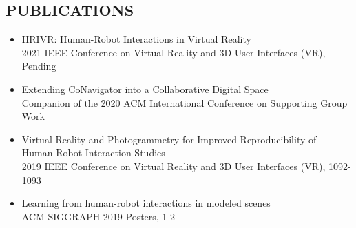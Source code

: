 \documentclass[line]{resume}
\begin{document}
\begin{resume}
\section {PUBLICATIONS}
  \begin{itemize}
      \item HRIVR: Human-Robot Interactions in Virtual Reality \\
        2021 IEEE Conference on Virtual Reality and 3D User Interfaces (VR), Pending
      \item Extending CoNavigator into a Collaborative Digital Space \\
        Companion of the 2020 ACM International Conference on Supporting Group Work
      \item Virtual Reality and Photogrammetry for Improved Reproducibility of Human-Robot Interaction Studies \\
        2019 IEEE Conference on Virtual Reality and 3D User Interfaces (VR), 1092-1093
      \item Learning from human-robot interactions in modeled scenes \\
        ACM SIGGRAPH 2019 Posters, 1-2
  \end{itemize}
 

\end{resume}
\end{document}
